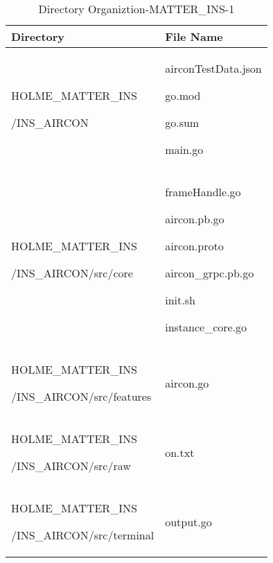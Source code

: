 \documentclass[conference]{IEEEtran}
\begin{document}
\begin{table}[h]
\caption{Directory Organiztion-MATTER\_INS-1}
\def\arraystretch{1.24} \small
    \begin{tabular}{|p{3.9cm}|p{3.9cm}|}
        \hline
        Directory & File Name \\ \hline
          HOLME\_MATTER\_INS\par/INS\_AIRCON & airconTestData.json\par go.mod\par go.sum\par main.go\\ \hline
          HOLME\_MATTER\_INS\par/INS\_AIRCON/src/core & frameHandle.go\par aircon.pb.go\par aircon.proto\par aircon\_grpc.pb.go\par init.sh\par instance\_core.go\\ \hline
          HOLME\_MATTER\_INS\par/INS\_AIRCON/src/features& aircon.go\\ \hline
          HOLME\_MATTER\_INS\par/INS\_AIRCON/src/raw& on.txt\\ \hline
          HOLME\_MATTER\_INS\par/INS\_AIRCON/src/terminal& output.go\\ \hline
	\end{tabular}
\end{table}
\end{document}
